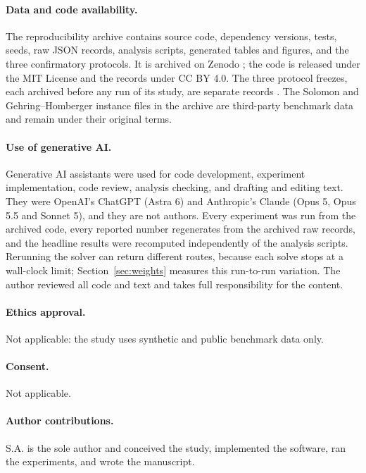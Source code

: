 \documentclass[11pt,a4paper]{article}
\begin{document}
\paragraph{Data and code availability.} The reproducibility archive contains
source code, dependency versions, tests, seeds, raw JSON records, analysis
scripts, generated tables and figures, and the three confirmatory protocols. It
is archived on Zenodo \cite{ali2026archive}; the code is released under the MIT
License and the records under CC BY 4.0. The three protocol freezes, each
archived before any run of its study, are separate records
\cite{ali2026freeze,ali2026freeze2,ali2026freeze3}. The Solomon and
Gehring--Homberger instance files in the archive are third-party benchmark data
\cite{solomon1987,ml4vrp2024,gehring1999} and remain under their original
terms.

\paragraph{Use of generative AI.} Generative AI assistants were used for
code development, experiment implementation, code review, analysis checking, and
drafting and editing text. They were OpenAI's ChatGPT (Astra 6) and Anthropic's
Claude (Opus 5, Opus 5.5 and Sonnet 5), and they are not authors. Every experiment
was run from the archived code, every reported number regenerates from the
archived raw records, and the headline results were recomputed independently of
the analysis scripts. Rerunning the solver can return different routes, because
each solve stops at a wall-clock limit; Section~\ref{sec:weights} measures this
run-to-run variation. The author reviewed all code and text and takes full
responsibility for the content.

\paragraph{Ethics approval.} Not applicable: the study uses synthetic and public
benchmark data only.

\paragraph{Consent.} Not applicable.

\paragraph{Author contributions.} S.A. is the sole author and conceived the
study, implemented the software, ran the experiments, and wrote the
manuscript.
\end{document}
